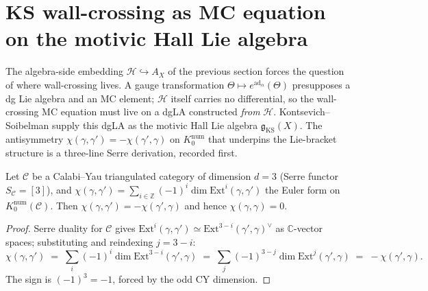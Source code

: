 \section{KS wall-crossing as MC equation on the motivic Hall Lie algebra}
\label{sec:ks-mc-on-hall-dgla}

The algebra-side embedding $\mathcal{H} \hookrightarrow A_X$ of the
previous section forces the question of where wall-crossing lives. A
gauge transformation $\Theta \mapsto e^{\mathrm{ad}_\alpha}(\Theta)$
presupposes a dg Lie algebra and an MC element; $\mathcal{H}$ itself
carries no differential, so the wall-crossing MC equation must live on
a dgLA constructed \emph{from} $\mathcal{H}$. Kontsevich--Soibelman
supply this dgLA as the motivic Hall Lie algebra
$\mathfrak{g}_{\mathrm{KS}}(X)$. The antisymmetry $\chi(\gamma,
\gamma') = -\chi(\gamma', \gamma)$ on $K_0^{\mathrm{num}}$ that
underpins the Lie-bracket structure is a three-line Serre derivation,
recorded first.

\begin{lemma}
\label{lem:serre-antisymmetry-cy3}
\ClaimStatusProvedHere
Let $\mathcal{C}$ be a Calabi--Yau triangulated category of dimension
$d = 3$ (Serre functor $S_{\mathcal{C}} = [3]$), and
$\chi(\gamma, \gamma') = \sum_{i \in \mathbb{Z}} (-1)^i \dim
\mathrm{Ext}^i(\gamma, \gamma')$ the Euler form on
$K_0^{\mathrm{num}}(\mathcal{C})$. Then $\chi(\gamma, \gamma') = -
\chi(\gamma', \gamma)$ and hence $\chi(\gamma, \gamma) = 0$.
\end{lemma}

\begin{proof}
Serre duality for $\mathcal{C}$ gives
$\mathrm{Ext}^i(\gamma, \gamma') \simeq \mathrm{Ext}^{3 - i}(\gamma',
\gamma)^\vee$ as $\mathbb{C}$-vector spaces; substituting and
reindexing $j = 3 - i$:
\[
 \chi(\gamma, \gamma')
 \;=\; \sum_i (-1)^i \dim \mathrm{Ext}^{3-i}(\gamma', \gamma)
 \;=\; \sum_j (-1)^{3-j} \dim \mathrm{Ext}^j(\gamma', \gamma)
 \;=\; -\chi(\gamma', \gamma).
\]
The sign is $(-1)^3 = -1$, forced by the odd CY dimension.
\end{proof}

